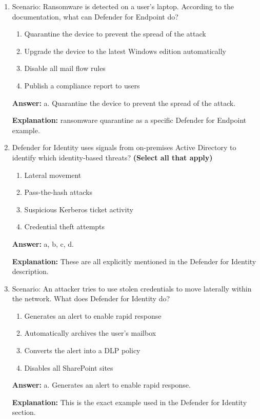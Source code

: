 \documentclass[10pt]{article}
\begin{document}
\begin{enumerate}[leftmargin=*]
\item Scenario: Ransomware is detected on a user’s laptop. According to the documentation, what can Defender for Endpoint do?
\begin{enumerate}[label=\alph*., leftmargin=1.5em]
\item Quarantine the device to prevent the spread of the attack
\item Upgrade the device to the latest Windows edition automatically
\item Disable all mail flow rules
\item Publish a compliance report to users
\end{enumerate}
\textbf{Answer:} a. Quarantine the device to prevent the spread of the attack.

\textbf{Explanation:} ransomware quarantine as a specific Defender for Endpoint example.

\item Defender for Identity uses signals from on-premises Active Directory to identify which identity-based threats? \textbf{(Select all that apply)}
\begin{enumerate}[label=\alph*., leftmargin=1.5em]
\item Lateral movement
\item Pass-the-hash attacks
\item Suspicious Kerberos ticket activity
\item Credential theft attempts
\end{enumerate}
\textbf{Answer:} a, b, c, d.

\textbf{Explanation:} These are all explicitly mentioned in the Defender for Identity description.

\item Scenario: An attacker tries to use stolen credentials to move laterally within the network. What does Defender for Identity do?
\begin{enumerate}[label=\alph*., leftmargin=1.5em]
\item Generates an alert to enable rapid response
\item Automatically archives the user’s mailbox
\item Converts the alert into a DLP policy
\item Disables all SharePoint sites
\end{enumerate}
\textbf{Answer:} a. Generates an alert to enable rapid response.

\textbf{Explanation:} This is the exact example used in the Defender for Identity section.


\end{enumerate}
\end{document}
